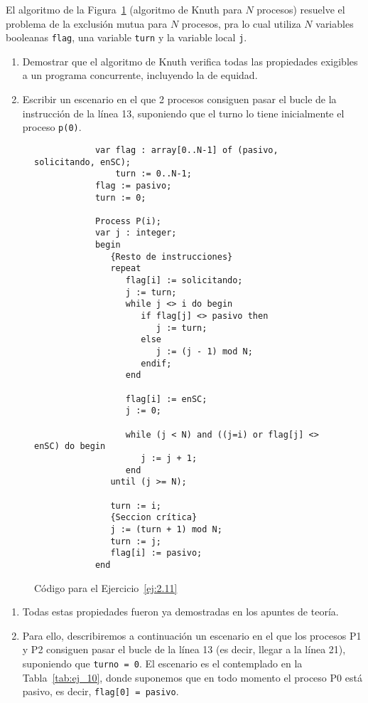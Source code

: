 \begin{ejercicio}\label{ej:2.11}
    El algoritmo de la Figura~\ref{fig:cod_11} (algoritmo de Knuth para $N$ procesos) resuelve el problema de la exclusión mutua para $N$ procesos, pra lo cual utiliza $N$ variables booleanas \verb|flag|, una variable \verb|turn| y la variable local \verb|j|.
    \begin{enumerate}[label=(\alph*)]
        \item Demostrar que el algoritmo de Knuth verifica todas las propiedades exigibles a un programa concurrente, incluyendo la de equidad.
        \item Escribir un escenario en el que 2 procesos consiguen pasar el bucle de la instrucción de la línea 13, suponiendo que el turno lo tiene inicialmente el proceso \verb|p(0)|.
    \end{enumerate}

    \begin{figure}
        \centering
        \begin{verbatim}
            var flag : array[0..N-1] of (pasivo, solicitando, enSC);
                turn := 0..N-1;
            flag := pasivo;
            turn := 0;

            Process P(i);
            var j : integer;
            begin
               {Resto de instrucciones}
               repeat
                  flag[i] := solicitando;
                  j := turn;
                  while j <> i do begin
                     if flag[j] <> pasivo then
                        j := turn;
                     else
                        j := (j - 1) mod N;
                     endif;
                  end

                  flag[i] := enSC;
                  j := 0;

                  while (j < N) and ((j=i) or flag[j] <> enSC) do begin
                     j := j + 1;
                  end
               until (j >= N);

               turn := i;
               {Seccion crítica}
               j := (turn + 1) mod N;
               turn := j;
               flag[i] := pasivo;
            end
        \end{verbatim}
        \caption{Código para el Ejercicio~\ref{ej:2.11}}
        \label{fig:cod_11}
    \end{figure}
    \begin{enumerate}[label=(\alph*)]
        \item Todas estas propiedades fueron ya demostradas en los apuntes de teoría.
        \item Para ello, describiremos a continuación un escenario en el que los procesos P1 y P2 consiguen pasar el bucle de la línea 13 (es decir, llegar a la línea 21), suponiendo que \verb|turno = 0|. El escenario es el contemplado en la Tabla~\ref{tab:ej_10}, donde suponemos que en todo momento el proceso P0 está pasivo, es decir, \verb|flag[0] = pasivo|.


\end{enumerate}
\end{ejercicio}
